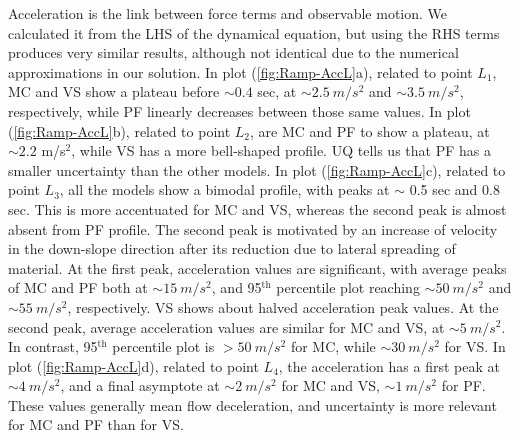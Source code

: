 \documentclass{article}
\begin{document}
Acceleration is the link between force terms and observable motion. We calculated it from the LHS of the dynamical equation, but using the RHS terms produces very similar results, although not identical due to the numerical approximations in our solution. In plot (\ref{fig:Ramp-AccL}a), related to point $L_1$, MC and VS show a plateau before $\sim 0.4$ sec, at $\sim 2.5 \ m/s^2$ and $\sim 3.5 \ m/s^2$, respectively, while PF linearly decreases between those same values. In plot (\ref{fig:Ramp-AccL}b), related to point $L_2$, are MC and PF to show a plateau, at $\sim 2.2$ m/s$^2$, while VS has a more bell-shaped profile. UQ tells us that PF has a smaller uncertainty than the other models. In plot (\ref{fig:Ramp-AccL}c), related to point $L_3$, all the models show a bimodal profile, with peaks at $\sim$ 0.5 sec and 0.8 sec. This is more accentuated for MC and VS, whereas the second peak is almost absent from PF profile. The second peak is motivated by an increase of velocity in the down-slope direction after its reduction due to lateral spreading of material. At the first peak, acceleration values are significant, with average peaks of MC and PF both at $\sim 15 \ m/s^2$, and 95$^{\mathrm{th}}$ percentile plot reaching $\sim 50 \ m/s^2$ and $\sim 55 \ m/s^2$, respectively. VS shows about halved acceleration peak values. At the second peak, average acceleration values are similar for MC and VS, at $\sim 5 \ m/s^2$. In contrast, 95$^{\mathrm{th}}$ percentile plot is $> 50 \ m/s^2$ for MC, while $\sim 30 \ m/s^2$ for VS. In plot (\ref{fig:Ramp-AccL}d), related to point $L_4$, the acceleration has a first peak at $\sim 4 \ m/s^2$, and a final asymptote at $\sim 2 \ m/s^2$ for MC and VS, $\sim 1 \ m/s^2$ for PF. These values generally mean flow deceleration, and uncertainty is more relevant for MC and PF than for VS.
\end{document}
